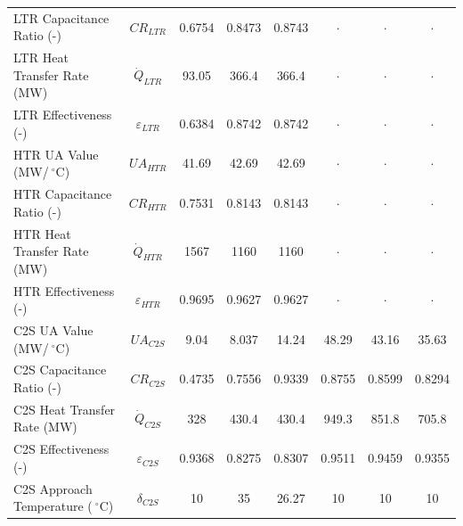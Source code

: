\documentclass[sustainability,article,accept,moreauthors,pdftex]{Definitions/mdpi}
\begin{document}
\begin{paracol}{2}
\begin{specialtable}[H]
{\begin{tabular}{lc|c|cc|ccc}
            LTR Capacitance Ratio (-)	&	$CR_{LTR}$	&	0.6754	&	0.8473	&	0.8743	&	$\cdot$	&	$\cdot$	&	$\cdot$	\\
            LTR Heat Transfer Rate (MW)	&	$\dot{Q}_{LTR}$	&	93.05	&	366.4	&	366.4	&	$\cdot$	&	$\cdot$	&	$\cdot$	\\
            LTR Effectiveness (-)	&	$\varepsilon_{LTR}$	&	0.6384	&	0.8742	&	0.8742	&	$\cdot$	&	$\cdot$	&	$\cdot$	\\
            HTR UA Value (MW/$~^{\circ}$C)	&	$UA_{HTR}$	&	41.69	&	42.69	&	42.69	&	$\cdot$	&	$\cdot$	&	$\cdot$	\\
            HTR Capacitance Ratio (-)	&	$CR_{HTR}$	&	0.7531	&	0.8143	&	0.8143	&	$\cdot$	&	$\cdot$	&	$\cdot$	\\
            HTR Heat Transfer Rate (MW)	&	$\dot{Q}_{HTR}$	&	1567	&	1160	&	1160	&	$\cdot$	&	$\cdot$	&	$\cdot$	\\
            HTR Effectiveness (-)	&	$\varepsilon_{HTR}$	&	0.9695	&	0.9627	&	0.9627	&	$\cdot$	&	$\cdot$	&	$\cdot$	\\
            C2S UA Value (MW/$~^{\circ}$C)	&	$UA_{C2S}$	&	9.04	&	8.037	&	14.24	&	48.29	&	43.16	&	35.63	\\
            C2S Capacitance Ratio (-)	&	$CR_{C2S}$	&	0.4735	&	0.7556	&	0.9339	&	0.8755	&	0.8599	&	0.8294	\\
            C2S Heat Transfer Rate (MW)	&	$\dot{Q}_{C2S}$	&	328	&	430.4	&	430.4	&	949.3	&	851.8	&	705.8	\\
            C2S Effectiveness (-)	&	$\varepsilon_{C2S}$	&	0.9368	&	0.8275	&	0.8307	&	0.9511	&	0.9459	&	0.9355	\\
            C2S Approach Temperature ($~^{\circ}$C)	&	$\delta_{C2S}$	&	10	&	35	&	26.27	&	10	&	10	&	10	\\
            \bottomrule
        \end{tabular}
        }
    \end{specialtable}
        

\end{paracol}
\end{document}

